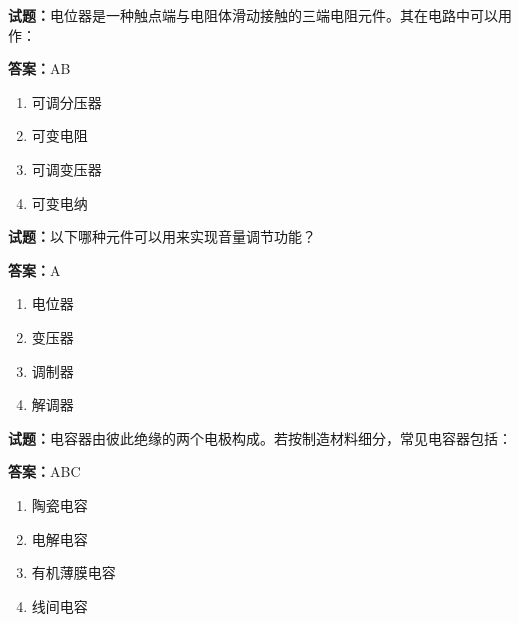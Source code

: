 \documentclass{ctexbook}
\begin{document}




\vspace{1em}

\textbf{试题：}电位器是一种触点端与电阻体滑动接触的三端电阻元件。其在电路中可以用作： 

\textbf{答案：}AB 


\begin{enumerate}[leftmargin=3em]
  \item 可调分压器 

  \item 可变电阻 

  \item 可调变压器 

  \item 可变电纳 

\end{enumerate}





\vspace{1em}

\textbf{试题：}以下哪种元件可以用来实现音量调节功能？ 

\textbf{答案：}A 

\begin{enumerate}[leftmargin=3em]
  \item 电位器 

  \item 变压器 

  \item 调制器 

  \item 解调器 

\end{enumerate}





\vspace{1em}

\textbf{试题：}电容器由彼此绝缘的两个电极构成。若按制造材料细分，常见电容器包括： 

\textbf{答案：}ABC 

\begin{enumerate}[leftmargin=3em]
  \item 陶瓷电容 

  \item 电解电容 

  \item 有机薄膜电容 

  \item 线间电容 

\end{enumerate}
\end{document}
